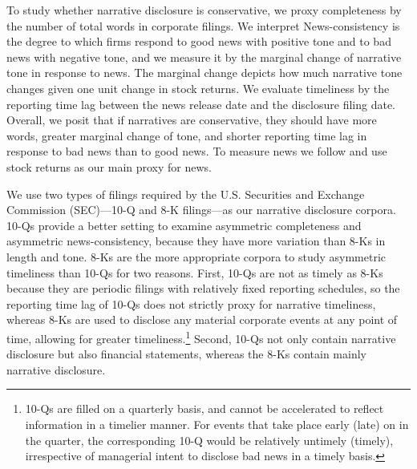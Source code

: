 \documentclass[letterpaper,12pt]{article}
\begin{document}
\begin{spacing}{1.5}
To study whether narrative disclosure is conservative, we proxy completeness by the number of total words in corporate filings. We interpret News-consistency is the degree to which firms respond to good news with positive tone and to bad news with negative tone, and we measure it by the marginal change of narrative tone in response to news. The marginal change depicts how much narrative tone changes given one unit change in stock returns. 
We evaluate timeliness by the reporting time lag between the news release date and the disclosure filing date. Overall, we posit that if narratives are conservative, they should have more words, greater marginal change of tone, and shorter reporting time lag in response to bad news than to good news. To measure news we follow  and use stock returns as our main proxy for news.

We use two types of filings required by the U.S. Securities and Exchange Commission (SEC)---10-Q and 8-K filings---as our narrative disclosure corpora. 10-Qs provide a better setting to examine asymmetric completeness and asymmetric news-consistency, because they have more variation than 8-Ks in length and tone. 8-Ks are the more appropriate corpora to study asymmetric timeliness than 10-Qs for two reasons. First, 10-Qs are not as timely as 8-Ks because they are periodic filings with relatively fixed reporting schedules, so the reporting time lag of 10-Qs does not strictly proxy for narrative timeliness, whereas 8-Ks are used to disclose any material corporate events at any point of time, allowing for greater timeliness.\footnote{10-Qs are filled on a quarterly basis, and cannot be accelerated to reflect information in a timelier manner. For events that take place early (late) on in the quarter, the corresponding 10-Q would be relatively untimely (timely), irrespective of managerial intent to disclose bad news in a timely basis.}  Second, 10-Qs not only contain narrative disclosure but also financial statements,  whereas the 8-Ks contain mainly narrative disclosure.


\end{spacing}
\end{document}
